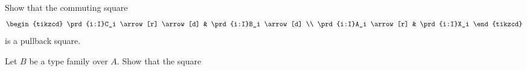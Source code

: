 \begin{exercises}
\begin{subexenum}
\item Show that the commuting square
\begin{equation*}
\begin{tikzcd}
\prd{i:I}C_i \arrow[r] \arrow[d] & \prd{i:I}B_i \arrow[d] \\
\prd{i:I}A_i \arrow[r] & \prd{i:I}X_i
\end{tikzcd}
\end{equation*}
is a pullback square.
\end{subexenum}
\item Let $B$ be a type family over $A$. Show that the square
\begin{equation*}
\begin{tikzcd}[column sep=6em]

\end{tikzcd}
\end{equation*}
\end{exercises}
